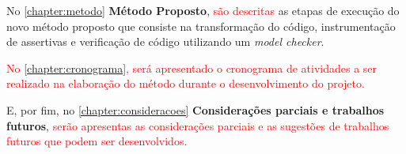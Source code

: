 \par
No \autoref{chapter:metodo} \textbf{Método Proposto}, \textcolor{red}{são descritas} as etapas de execução do novo método proposto que consiste na transformação do código, instrumentação de assertivas e verificação de código utilizando um \textit{model checker}.

\par
\textcolor{red}{No \autoref{chapter:cronograma}, será apresentado o cronograma de atividades a ser realizado na elaboração do método durante o desenvolvimento do projeto.}

\par

\par
E, por fim, no \autoref{chapter:consideracoes} \textbf{Considerações parciais e trabalhos futuros}, \textcolor{red}{serão apresentas as considerações parciais e as sugestões de trabalhos futuros que podem ser desenvolvidos.} 
